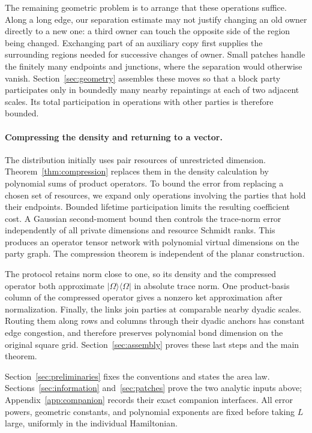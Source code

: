 The remaining geometric problem is to arrange that these operations
suffice. Along a long edge, our separation estimate may not justify
changing an old owner directly to a new one: a third owner can touch the
opposite side of the region being changed. Exchanging part of an auxiliary copy first supplies the
surrounding regions needed for successive changes of owner. Small patches
handle the finitely many endpoints and junctions, where the separation
would otherwise vanish. Section~\ref{sec:geometry} assembles these moves
so that a block party participates only in boundedly many nearby
repaintings at each of two adjacent scales. Its total participation in
operations with other parties is therefore bounded.

\paragraph{Compressing the density and returning to a vector.}
The distribution initially uses pair resources of unrestricted dimension.
Theorem~\ref{thm:compression} replaces them in the density calculation by
polynomial sums of product operators. To bound the error from
replacing a chosen set of resources, we expand only operations involving
the parties that hold their endpoints. Bounded lifetime participation
limits the resulting coefficient cost. A Gaussian
second-moment bound then controls the trace-norm error independently of
all private dimensions and resource Schmidt ranks. This produces an
operator tensor network with polynomial virtual dimensions on the party
graph. The compression theorem is independent of the planar construction.

The protocol retains norm close to one, so its density and the compressed
operator both approximate $|\Omega\rangle\langle\Omega|$ in absolute trace
norm. One product-basis column of the compressed operator gives a nonzero
ket approximation after normalization. Finally, the links join parties
at comparable nearby dyadic scales. Routing them along rows and columns
through their dyadic anchors has constant edge congestion, and therefore
preserves polynomial bond dimension on the original square grid.
Section~\ref{sec:assembly} proves these last steps and the main theorem.

Section~\ref{sec:preliminaries} fixes the conventions and states the area
law. Sections~\ref{sec:information} and~\ref{sec:patches} prove the two
analytic inputs above; Appendix~\ref{app:companion} records their exact
companion interfaces. All error powers, geometric constants, and
polynomial exponents are fixed before taking $L$ large, uniformly in the
individual Hamiltonian.

